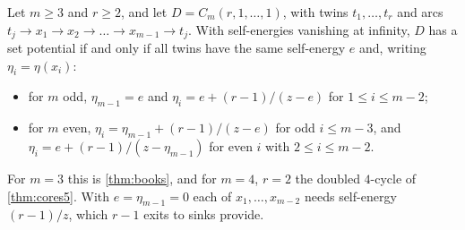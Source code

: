\documentclass[final]{siamart0516}
\numberwithin{theorem}{section}
\numberwithin{equation}{section}
\theoremstyle{siamnonum}
\theoremstyle{plain}
\begin{document}
\begin{theorem}\label{thm:one-blown}
Let $m\ge3$ and $r\ge2$, and let $D=C_m(r,1,\dots,1)$, with twins $t_1,\dots,t_r$ and arcs $t_j\to x_1\to x_2\to\dots\to x_{m-1}\to t_j$. With self-energies vanishing at infinity, $D$ has a set potential if and only if all twins have the same self-energy $e$ and, writing $\eta_i=\eta(x_i)$:
\begin{itemize}
\item for $m$ odd, $\eta_{m-1}=e$ and $\eta_i=e+(r-1)/(z-e)$ for $1\le i\le m-2$;
\item for $m$ even, $\eta_i=\eta_{m-1}+(r-1)/(z-e)$ for odd $i\le m-3$, and $\eta_i=e+(r-1)/(z-\eta_{m-1})$ for even $i$ with $2\le i\le m-2$.
\end{itemize}
For $m=3$ this is \cref{thm:books}, and for $m=4$, $r=2$ the doubled $4$-cycle of \cref{thm:cores5}. With $e=\eta_{m-1}=0$ each of $x_1,\dots,x_{m-2}$ needs self-energy $(r-1)/z$, which $r-1$ exits to sinks provide.
\end{theorem}
\end{document}
